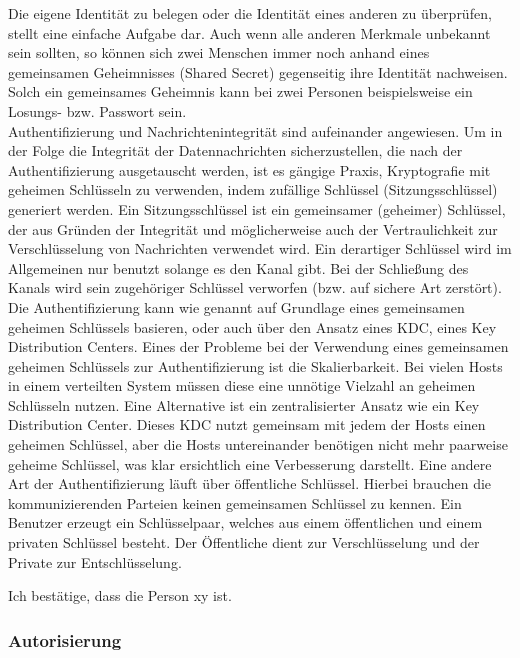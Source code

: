 \documentclass[letterpaper, 12pt]{article}
\let\tempsubsubsection\subsubsection
\renewcommand\subsubsection[1]{\vspace{0cm}\tempsubsubsection{#1}\vspace{0cm}}
\begin{document}
Die eigene Identität zu belegen oder die Identität eines anderen zu überprüfen, stellt eine einfache Aufgabe dar. Auch wenn alle anderen Merkmale unbekannt sein sollten, so können sich zwei Menschen immer noch anhand eines gemeinsamen Geheimnisses (Shared Secret) gegenseitig ihre Identität nachweisen. Solch ein gemeinsames Geheimnis kann bei zwei Personen beispielsweise ein Losungs- bzw. Passwort sein. \\
Authentifizierung und Nachrichtenintegrität sind aufeinander angewiesen. Um in der Folge die Integrität der Datennachrichten sicherzustellen, die nach der Authentifizierung ausgetauscht werden, ist es gängige Praxis, Kryptografie mit geheimen Schlüsseln zu verwenden, indem zufällige Schlüssel (Sitzungsschlüssel) generiert werden. Ein Sitzungsschlüssel ist ein gemeinsamer (geheimer) Schlüssel, der aus Gründen der Integrität und möglicherweise auch der Vertraulichkeit zur Verschlüsselung von Nachrichten verwendet wird. Ein derartiger Schlüssel wird im Allgemeinen nur benutzt solange es den Kanal gibt. Bei der Schließung des Kanals wird sein zugehöriger Schlüssel verworfen (bzw. auf sichere Art zerstört). \\
Die Authentifizierung kann wie genannt auf Grundlage eines gemeinsamen geheimen Schlüssels basieren, oder auch über den Ansatz eines KDC, eines Key Distribution Centers. Eines der Probleme bei der Verwendung eines gemeinsamen geheimen Schlüssels zur Authentifizierung ist die Skalierbarkeit. Bei vielen Hosts in einem verteilten System müssen diese eine unnötige Vielzahl an geheimen Schlüsseln nutzen. Eine Alternative ist ein zentralisierter Ansatz wie ein Key Distribution Center. Dieses KDC nutzt gemeinsam mit jedem der Hosts einen geheimen Schlüssel, aber die Hosts untereinander benötigen nicht mehr paarweise geheime Schlüssel, was klar ersichtlich eine Verbesserung darstellt. \clearpage
Eine andere Art der Authentifizierung läuft über öffentliche Schlüssel. Hierbei brauchen die kommunizierenden Parteien keinen gemeinsamen Schlüssel zu kennen. Ein Benutzer erzeugt ein Schlüsselpaar, welches aus einem öffentlichen und einem privaten Schlüssel besteht. Der Öffentliche dient zur Verschlüsselung und der Private zur Entschlüsselung. \cite{ausarbeitungauth}

\begin{center}
	Ich bestätige, dass die Person xy ist.
\end{center}

\subsubsection{Autorisierung}
\end{document}
